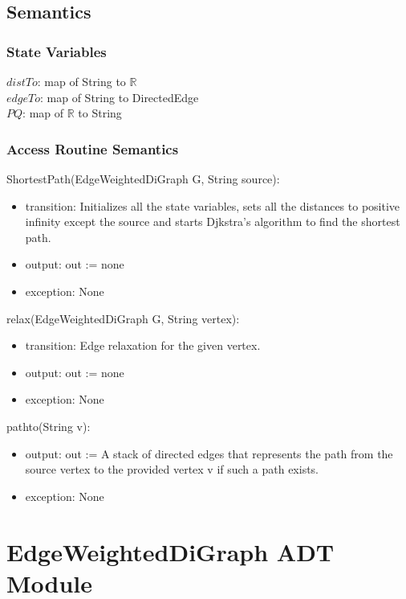 \documentclass[12pt]{article}
\begin{document}
\subsection* {Semantics}

\subsubsection* {State Variables}

$distTo$: map of String to $\mathbb{R}$\\
$edgeTo$: map of String to DirectedEdge\\
$PQ$: map of $\mathbb{R}$ to String

\subsubsection* {Access Routine Semantics}

ShortestPath(EdgeWeightedDiGraph G, String source):
\begin{itemize}
\item transition: Initializes all the state variables, sets all the distances to
positive infinity except the source and starts Djkstra's algorithm to find the shortest path.
\item output: out := none
\item exception: None
\end{itemize}

\noindent relax(EdgeWeightedDiGraph G, String vertex):
\begin{itemize}
\item transition: Edge relaxation for the given vertex.
\item output: out := none
\item exception: None
\end{itemize}

\noindent pathto(String v):
\begin{itemize}
\item output: out := A stack of directed edges that represents the path from the source
vertex to the provided vertex v if such a path exists.
\item exception: None
\end{itemize}

\newpage

\section* {EdgeWeightedDiGraph ADT Module}
\end{document}
